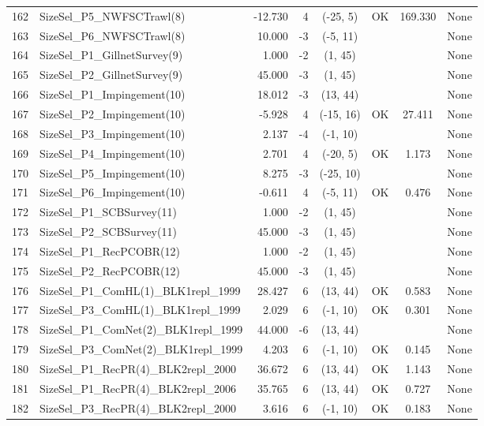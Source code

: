 \documentclass[12pt,]{article}
\begin{document}
\begin{landscape}
\begin{longtable}{rlrrcccl}
  162 & SizeSel\_P5\_NWFSCTrawl(8) & -12.730 & 4 & (-25, 5) & OK & 169.330 & None \\ 
  163 & SizeSel\_P6\_NWFSCTrawl(8) & 10.000 & -3 & (-5, 11) &  &  & None \\ 
  164 & SizeSel\_P1\_GillnetSurvey(9) & 1.000 & -2 & (1, 45) &  &  & None \\ 
  165 & SizeSel\_P2\_GillnetSurvey(9) & 45.000 & -3 & (1, 45) &  &  & None \\ 
  166 & SizeSel\_P1\_Impingement(10) & 18.012 & -3 & (13, 44) &  &  & None \\ 
  167 & SizeSel\_P2\_Impingement(10) & -5.928 & 4 & (-15, 16) & OK & 27.411 & None \\ 
  168 & SizeSel\_P3\_Impingement(10) & 2.137 & -4 & (-1, 10) &  &  & None \\ 
  169 & SizeSel\_P4\_Impingement(10) & 2.701 & 4 & (-20, 5) & OK & 1.173 & None \\ 
  170 & SizeSel\_P5\_Impingement(10) & 8.275 & -3 & (-25, 10) &  &  & None \\ 
  171 & SizeSel\_P6\_Impingement(10) & -0.611 & 4 & (-5, 11) & OK & 0.476 & None \\ 
  172 & SizeSel\_P1\_SCBSurvey(11) & 1.000 & -2 & (1, 45) &  &  & None \\ 
  173 & SizeSel\_P2\_SCBSurvey(11) & 45.000 & -3 & (1, 45) &  &  & None \\ 
  174 & SizeSel\_P1\_RecPCOBR(12) & 1.000 & -2 & (1, 45) &  &  & None \\ 
  175 & SizeSel\_P2\_RecPCOBR(12) & 45.000 & -3 & (1, 45) &  &  & None \\ 
  176 & SizeSel\_P1\_ComHL(1)\_BLK1repl\_1999 & 28.427 & 6 & (13, 44) & OK & 0.583 & None \\ 
  177 & SizeSel\_P3\_ComHL(1)\_BLK1repl\_1999 & 2.029 & 6 & (-1, 10) & OK & 0.301 & None \\ 
  178 & SizeSel\_P1\_ComNet(2)\_BLK1repl\_1999 & 44.000 & -6 & (13, 44) &  &  & None \\ 
  179 & SizeSel\_P3\_ComNet(2)\_BLK1repl\_1999 & 4.203 & 6 & (-1, 10) & OK & 0.145 & None \\ 
  180 & SizeSel\_P1\_RecPR(4)\_BLK2repl\_2000 & 36.672 & 6 & (13, 44) & OK & 1.143 & None \\ 
  181 & SizeSel\_P1\_RecPR(4)\_BLK2repl\_2006 & 35.765 & 6 & (13, 44) & OK & 0.727 & None \\ 
  182 & SizeSel\_P3\_RecPR(4)\_BLK2repl\_2000 & 3.616 & 6 & (-1, 10) & OK & 0.183 & None \\ 

\end{longtable}
\end{landscape}
\end{document}

